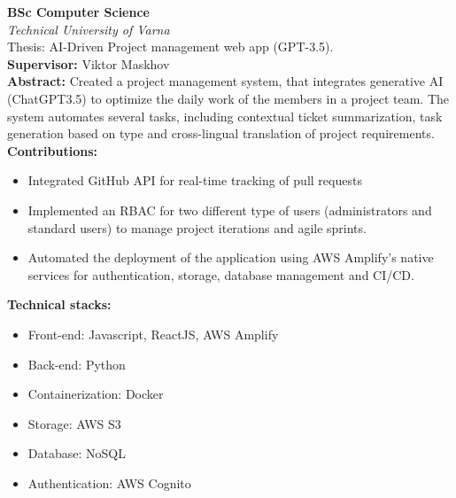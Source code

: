 \vspace{1ex}
\textbf{BSc Computer Science}  \\
\textit{Technical University of Varna} \\
\footnotesize Thesis: AI-Driven Project management web app (GPT-3.5). \\
\textbf{Supervisor:} Viktor Maskhov \\
\textbf{Abstract:} Created a project management system, that integrates generative AI (ChatGPT3.5) to optimize the daily work of the members in a project team. The system automates several tasks, including contextual ticket summarization, task generation based on type and cross-lingual translation of project requirements. \\
\textbf{Contributions:}
\begin{itemize}[label=\tiny$\bullet$, leftmargin=1em, nosep]
	\item Integrated GitHub API for real-time tracking of pull requests
	\item Implemented an RBAC for two different type of users (administrators and standard users) to manage project iterations and agile sprints.
	\item Automated the deployment of the application using AWS Amplify's native services for authentication, storage, database management and CI/CD.
\end{itemize}

\noindent \textbf{Technical stacks:}
\begin{itemize}[label=\tiny$\bullet$, leftmargin=1em]
	\item Front-end: Javascript, ReactJS, AWS Amplify
	\item Back-end: Python
	\item Containerization: Docker
	\item Storage: AWS S3
	\item Database: NoSQL
	\item Authentication: AWS Cognito
\end{itemize}

